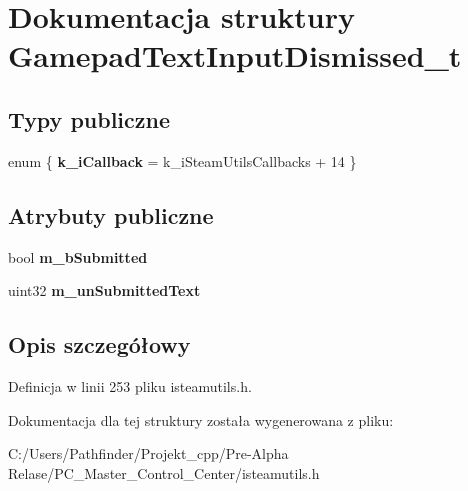 \hypertarget{struct_gamepad_text_input_dismissed__t}{}\section{Dokumentacja struktury Gamepad\+Text\+Input\+Dismissed\+\_\+t}
\label{struct_gamepad_text_input_dismissed__t}
\subsection*{Typy publiczne}
\begin{DoxyCompactItemize}
\item 
\mbox{\label{struct_gamepad_text_input_dismissed__t_a34846339b3653ab3d61574af3fb4fe73}} 
enum \{ {\bfseries k\+\_\+i\+Callback} = k\+\_\+i\+Steam\+Utils\+Callbacks + 14
 \}
\end{DoxyCompactItemize}
\subsection*{Atrybuty publiczne}
\begin{DoxyCompactItemize}
\item 
\mbox{\label{struct_gamepad_text_input_dismissed__t_af72d1b82ef1c40e3b7ae3a47e8671bbc}} 
bool {\bfseries m\+\_\+b\+Submitted}
\item 
\mbox{\label{struct_gamepad_text_input_dismissed__t_a0de070797255efd689ddac9b967aaecc}} 
uint32 {\bfseries m\+\_\+un\+Submitted\+Text}
\end{DoxyCompactItemize}


\subsection{Opis szczegółowy}


Definicja w linii 253 pliku isteamutils.\+h.



Dokumentacja dla tej struktury została wygenerowana z pliku\+:\begin{DoxyCompactItemize}
\item 
C\+:/\+Users/\+Pathfinder/\+Projekt\+\_\+cpp/\+Pre-\/\+Alpha Relase/\+P\+C\+\_\+\+Master\+\_\+\+Control\+\_\+\+Center/isteamutils.\+h\end{DoxyCompactItemize}
